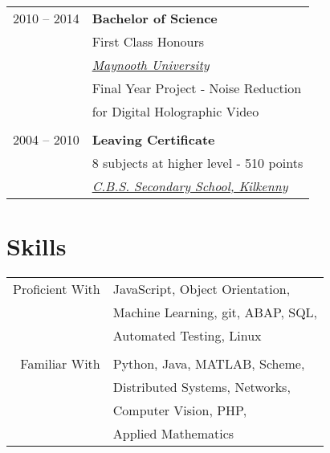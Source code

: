 \documentclass[10pt]{article} %
\begin{document}
{\begin{minipage}[t]{0.44\textwidth}
\begin{tabular}{rl} %


2010 -- \textsc{2014} & \textbf{Bachelor of Science} \\  
& \small First Class Honours \\
& \textit{\href{https://www.maynoothuniversity.ie/}{Maynooth University}} \\
& Final Year Project - Noise Reduction \\
& for Digital Holographic Video \\
&\\

2004 -- \textsc{2010} & \textbf{Leaving Certificate} \\  
& \small 8 subjects at higher level - 510 points \\
& \textit{\href{http://www.cbskilkenny.ie/}{C.B.S. Secondary School, Kilkenny}} \\

\end{tabular}


\section{Skills} 

\begin{tabular}{rl}
Proficient With
& JavaScript, Object Orientation, \\
& Machine Learning, git, ABAP, SQL, \\
& Automated Testing, Linux \\
& \\
Familiar With
& Python, Java, MATLAB, Scheme, \\
& Distributed Systems, Networks, \\
& Computer Vision, PHP, \\
& Applied Mathematics \\ 
\end{tabular}




\end{minipage}}
\end{document}
